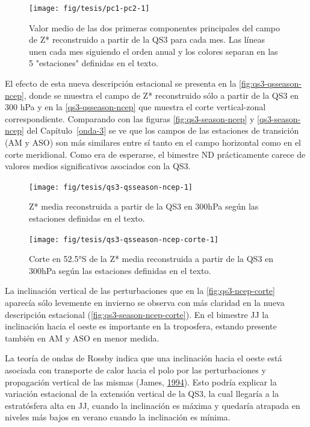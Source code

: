 \documentclass[spanish,a4paper,12pt,oneside]{book}
\begin{document}
\begin{figure}
\texttt{[image: fig/tesis/pc1-pc2-1]} \caption{Valor medio de las dos primeras componentes principales del campo de Z* reconstruido a partir de la QS3 para cada mes. Las líneas unen cada mes siguiendo el orden anual y los colores separan en las 5 "estaciones" definidas en el texto.}\label{fig:pc1-pc2}
\end{figure}

El efecto de esta nueva descripción estacional se presenta en la
\autoref{fig:qs3-qsseason-ncep}, donde se muestra el campo de Z*
reconstruido sólo a partir de la QS3 en 300 hPa y en la
\autoref{qs3-qsseason-ncep} que muestra el corte vertical-zonal
correspondiente. Comparando con las figuras \ref{fig:qs3-season-ncep} y
\ref{qs3-season-ncep} del Capítulo~\ref{onda-3} se ve que los campos de
las estaciones de transición (AM y ASO) son más similares entre sí tanto
en el campo horizontal como en el corte meridional. Como era de
esperarse, el bimestre ND prácticamente carece de valores medios
significativos asociados con la QS3.

\begin{figure}
\texttt{[image: fig/tesis/qs3-qsseason-ncep-1]} \caption{Z* media reconstruida a partir de la QS3 en 300hPa según las estaciones definidas en el texto.}\label{fig:qs3-qsseason-ncep}
\end{figure}

\begin{figure}
\texttt{[image: fig/tesis/qs3-qsseason-ncep-corte-1]} \caption{Corte en 52.5°S de la Z* media reconstruida a partir de la QS3 en 300hPa según las estaciones definidas en el texto.}\label{fig:qs3-qsseason-ncep-corte}
\end{figure}

La inclinación vertical de las perturbaciones que en la
\autoref{fig:qs3-ncep-corte} aparecía sólo levemente en invierno se
observa con más claridad en la nueva descripción estacional
(\autoref{fig:qs3-season-ncep-corte}). En el bimestre JJ la inclinación
hacia el oeste es importante en la troposfera, estando presente también
en AM y ASO en menor medida.

La teoría de ondas de Rossby indica que una inclinación hacia el oeste
está asociada con transporte de calor hacia el polo por las
perturbaciones y propagación vertical de las mismas (James,
\protect\hyperlink{ref-James}{1994}). Esto podría explicar la variación
estacional de la extensión vertical de la QS3, la cual llegaría a la
estratósfera alta en JJ, cuando la inclinación es máxima y quedaría
atrapada en niveles más bajos en verano cuando la inclinación es mínima.
\end{document}
